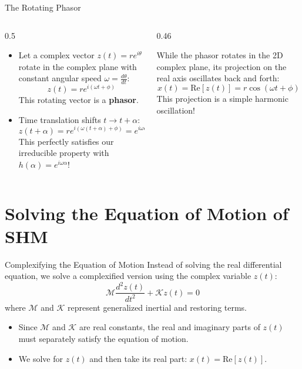\documentclass[aspectratio=169,xcolor=dvipsnames]{beamer}
\begin{document}
\begin{frame}{The Rotating Phasor}
  \begin{columns}[T]
    \begin{column}{0.5\textwidth}
      \begin{itemize}
        \item Let a complex vector $z(t) = re^{i\theta}$ rotate in the complex plane with constant angular speed $\omega = \frac{d\theta}{dt}$:
              \[
                z(t) = re^{i(\omega t + \phi)}
              \]
              This rotating vector is a \textbf{phasor}.
        \item Time translation shifts $t \to t+\alpha$:
              \[
                z(t+\alpha) = re^{i(\omega(t+\alpha)+\phi)} = e^{i\omega\alpha}z(t)
              \]
              This perfectly satisfies our irreducible property with $h(\alpha) = e^{i\omega\alpha}$!
      \end{itemize}
    \end{column}
    \hfill
    \begin{column}{0.46\textwidth}
      \begin{umnote}
        While the phasor rotates in the 2D complex plane, its projection on the real axis oscillates back and forth:
        \[
          x(t) = \text{Re}[z(t)] = r\cos(\omega t + \phi)
        \]
        This projection is a simple harmonic oscillation!
      \end{umnote}
    \end{column}
  \end{columns}
\end{frame}

\section{Solving the Equation of Motion of SHM}

\begin{frame}{Complexifying the Equation of Motion}
  Instead of solving the real differential equation, we solve a complexified version using the complex variable $z(t)$:
  \begin{equation}
    \mathcal{M}\frac{d^2z(t)}{dt^2} + \mathcal{K}z(t) = 0
    \label{eq:complex-sho}
  \end{equation}
  where $\mathcal{M}$ and $\mathcal{K}$ represent generalized inertial and restoring terms.
  \pause
  \vspace{0.8em}
  \begin{umnote}[Strategy]
    \begin{itemize}
      \item Since $\mathcal{M}$ and $\mathcal{K}$ are real constants, the real and imaginary parts of $z(t)$ must separately satisfy the equation of motion.
      \item We solve for $z(t)$ and then take its real part: $x(t) = \text{Re}[z(t)]$.
    \end{itemize}
  \end{umnote}
\end{frame}
\end{document}
